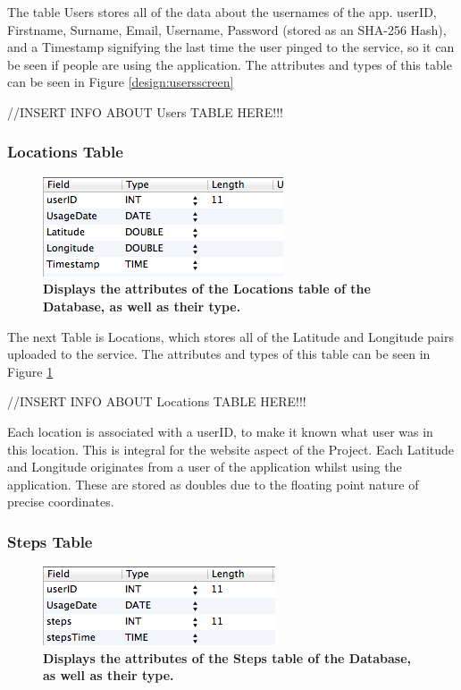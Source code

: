 \documentclass{l4proj}
\begin{document}
The table Users stores all of the data about the usernames of the app. userID, Firstname, Surname, Email, Username, Password (stored as an SHA-256 Hash), and a Timestamp signifying the last time the user pinged to the service, so it can be seen if people are using the application. The attributes and types of this table can be seen in Figure \ref{design:usersscreen}

//INSERT INFO ABOUT Users TABLE HERE!!!

\subsubsection{Locations Table}

\begin{figure}[H]
\centering
\includegraphics[scale=1.0]{images/screenshots/locationsscreen.png}
\caption{\textbf{Displays the attributes of the Locations table of the Database, as well as their type.}}
\label{design:locationsscreen}
\end{figure}

The next Table is Locations, which stores all of the Latitude and Longitude pairs uploaded to the service. The attributes and types of this table can be seen in Figure \ref{design:locationsscreen}

//INSERT INFO ABOUT Locations TABLE HERE!!!

Each location is associated with a userID, to make it known what user was in this location. This is integral for the website aspect of the Project. Each Latitude and Longitude originates from a user of the application whilst using the application. These are stored as doubles due to the floating point nature of precise coordinates.

\subsubsection{Steps Table}

\begin{figure}[H]
\centering
\includegraphics[scale=1.0]{images/screenshots/stepsscreen.png}
\caption{\textbf{Displays the attributes of the Steps table of the Database, as well as their type.}}
\label{design:stepsscreen}
\end{figure}
\end{document}
